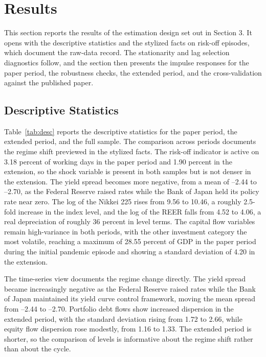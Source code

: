 \section{Results}

This section reports the results of the estimation design set out in Section 3. It opens with the descriptive statistics and the stylized facts on risk-off episodes, which document the raw-data record. The stationarity and lag selection diagnostics follow, and the section then presents the impulse responses for the paper period, the robustness checks, the extended period, and the cross-validation against the published paper.

\subsection{Descriptive Statistics}

Table~\ref{tab:desc} reports the descriptive statistics for the paper period, the extended period, and the full sample. The comparison across periods documents the regime shift previewed in the stylized facts. The risk-off indicator is active on 3.18 percent of working days in the paper period and 1.90 percent in the extension, so the shock variable is present in both samples but is not denser in the extension. The yield spread becomes more negative, from a mean of --2.44 to --2.70, as the Federal Reserve raised rates while the Bank of Japan held its policy rate near zero. The log of the Nikkei 225 rises from 9.56 to 10.46, a roughly 2.5-fold increase in the index level, and the log of the REER falls from 4.52 to 4.06, a real depreciation of roughly 36 percent in level terms. The capital flow variables remain high-variance in both periods, with the other investment category the most volatile, reaching a maximum of 28.55 percent of GDP in the paper period during the initial pandemic episode and showing a standard deviation of 4.20 in the extension.

The time-series view documents the regime change directly. The yield spread became increasingly negative as the Federal Reserve raised rates while the Bank of Japan maintained its yield curve control framework, moving the mean spread from --2.44 to --2.70. Portfolio debt flows show increased dispersion in the extended period, with the standard deviation rising from 1.72 to 2.66, while equity flow dispersion rose modestly, from 1.16 to 1.33. The extended period is shorter, so the comparison of levels is informative about the regime shift rather than about the cycle.

